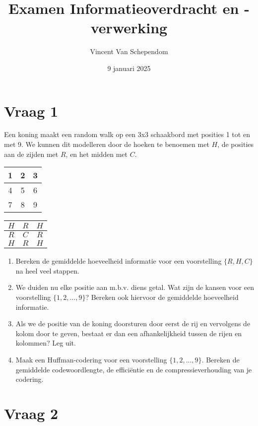 \documentclass{kuburgiearticle}
\title{Examen Informatieoverdracht en -verwerking}
\author{Vincent Van Schependom}
\date{9 januari 2025}
\begin{document}
	\maketitle

	\section*{Vraag 1}

	Een koning maakt een random walk op een 3x3 schaakbord met posities 1 tot en met 9. We kunnen dit modelleren door de hoeken te benoemen met \(H\), de posities aan de zijden met \(R\), en het midden met \(C\).

	\renewcommand{\arraystretch}{1.5}
	\begin{table}[h!]
		\centering
		\begin{tabular}{|c|c|c|}
			\hline
			1 & 2 & 3 \\
			\hline
			4 & 5 & 6 \\
			\hline
			7 & 8 & 9 \\
			\hline
		\end{tabular}
		\hspace{2cm}
		\begin{tabular}{|c|c|c|}
			\hline
			\(H\) & \(R\) & \(H\) \\
			\hline
			\(R\) & \(C\) & \(R\) \\
			\hline
			\(H\) & \(R\) & \(H\) \\
			\hline
		\end{tabular}
	\end{table}

	\begin{enumerate}
		\item Bereken de gemiddelde hoeveelheid informatie voor een voorstelling \(\{R,H,C\}\) na heel veel stappen.
		\item We duiden nu elke positie aan m.b.v. diens getal. Wat zijn de kansen voor een voorstelling \(\{1,2,...,9\}\)? Bereken ook hiervoor de gemiddelde hoeveelheid informatie.
		\item Als we de positie van de koning doorsturen door eerst de rij en vervolgens de kolom door te geven, bestaat er dan een afhankelijkheid tussen de rijen en kolommen? Leg uit.
		\item Maak een Huffman-codering voor een voorstelling \(\{1,2,...,9\}\). Bereken de gemiddelde codewoordlengte, de efficiëntie en de compressieverhouding van je codering.
	\end{enumerate}

	\section*{Vraag 2}
\end{document}

